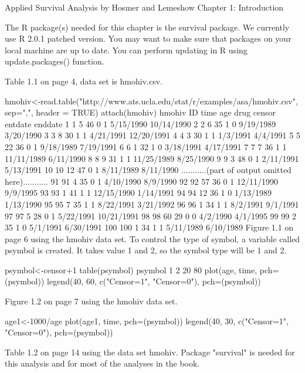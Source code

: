 Applied Survival Analysis by Hosmer and Lemeshow
Chapter 1: Introduction

The R package(s) needed for this chapter is the survival package. We currently use R 2.0.1 patched version. You may want to make sure that packages on your local machine are up to date. You can perform updating in R using update.packages() function.

Table 1.1 on page 4, data set is hmohiv.csv.

 hmohiv<-read.table("http://www.ats.ucla.edu/stat/r/examples/asa/hmohiv.csv", sep=",", header = TRUE)
 attach(hmohiv)
 hmohiv
     ID time age drug censor     entdate     enddate
1     1    5  46    0      1  5/15/1990  10/14/1990 
2     2    6  35    1      0  9/19/1989   3/20/1990 
3     3    8  30    1      1  4/21/1991  12/20/1991 
4     4    3  30    1      1   1/3/1991    4/4/1991 
5     5   22  36    0      1  9/18/1989   7/19/1991 
6     6    1  32    1      0  3/18/1991   4/17/1991 
7     7    7  36    1      1 11/11/1989   6/11/1990 
8     8    9  31    1      1 11/25/1989   8/25/1990 
9     9    3  48    0      1  2/11/1991   5/13/1991 
10   10   12  47    0      1  8/11/1989   8/11/1990 
...........(part of output omitted here)...........
91   91    4  35    0      1  4/10/1990    8/9/1990 
92   92   57  36    0      1 12/11/1990    9/9/1995 
93   93    1  41    1      1 12/15/1990   1/14/1991 
94   94   12  36    1      0  1/13/1989   1/13/1990 
95   95    7  35    1      1  8/22/1991   3/21/1992 
96   96    1  34    1      1   8/2/1991    9/1/1991 
97   97    5  28    0      1  5/22/1991  10/21/1991 
98   98   60  29    0      0   4/2/1990    4/1/1995 
99   99    2  35    1      0   5/1/1991   6/30/1991 
100 100    1  34    1      1  5/11/1989   6/10/1989 
Figure 1.1 on page 6 using the hmohiv data set. To control the type of symbol, a variable called psymbol is created. It takes value 1 and 2, so the symbol type will be 1 and 2.

psymbol<-censor+1
table(psymbol)
  psymbol
   1  2 
  20 80 
plot(age, time, pch=(psymbol))
legend(40, 60, c("Censor=1", "Censor=0"), pch=(psymbol))

Figure 1.2 on page 7 using the hmohiv data set.

age1<-1000/age
plot(age1, time, pch=(psymbol))
legend(40, 30, c("Censor=1", "Censor=0"), pch=(psymbol))

Table 1.2 on page 14 using the data set hmohiv. Package "survival" is needed for this analysis and for most of the analyses in the book.

